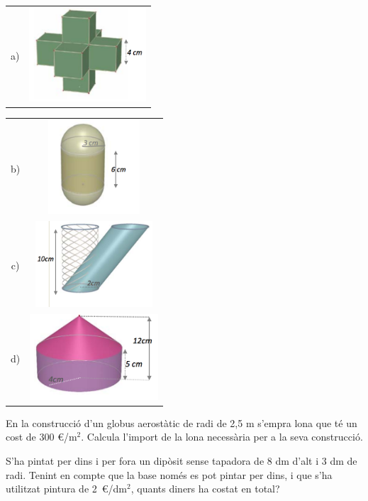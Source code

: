 \begin{activitats}
\begin{mylist}
\begin{tabular}{cc}	
a) & \includegraphics[height=3.5cm]{img-11/87a} \\
\end{tabular}


\begin{tabular}{cc}
b) & \includegraphics[height=3.5cm]{img-11/87b} \\

c) &  \includegraphics[height=3.2cm]{img-11/87c} \\

d) &  \includegraphics[height=3.2cm]{img-11/87d} \\
\end{tabular}


\exer  En la construcció d'un globus aerostàtic de radi de 2,5 m s'empra lona que té un cost de 300 \euro{}/m${}^{2}$. Calcula l'import de la lona necessària per a la seva construcció.


\exer  S'ha pintat per dins i per fora un dipòsit sense tapadora de 8 dm d'alt i 3 dm de radi. Tenint en compte que la base només es pot pintar per dins, i que s'ha utilitzat pintura de 2~\euro{}/dm${}^{2}$, quants diners ha costat en total?


\end{mylist}
\end{activitats}
